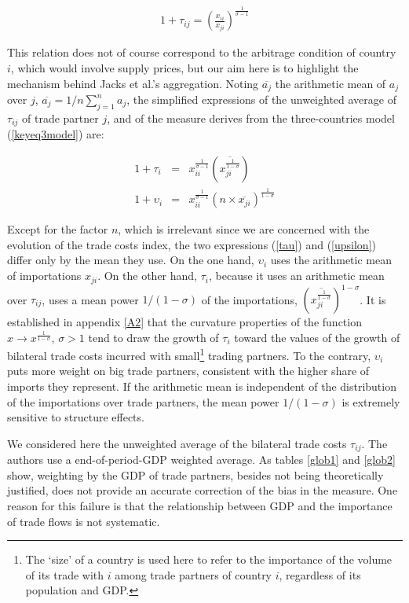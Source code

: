 \documentclass{article}
\begin{document}
\begin{eqnarray}
1+\tau_{ij}= \left(\frac{x_{ii}}{x_{ji}}\right)^{\frac{1}{\sigma-1}}\label{tausimplified}
\end{eqnarray}

This relation does not of course correspond to the arbitrage
condition of country $i$, which would involve supply prices,
but our aim here is to highlight the mechanism behind Jacks et
al.'s aggregation. Noting $\overline{a_j}$ the arithmetic mean
of $a_j$ over $j$, $\overline{a_j}=1/n \sum_{j=1}^{n}a_j$, the
simplified expressions of the unweighted average of $\tau_{ij}$
of trade partner $j$, and of the measure derives from the
three-countries model (\ref{keyeq3model}) are:

\begin{eqnarray}
1+\tau_i&=& x_{ii}^{\frac{1}{\sigma-1}} \left(\overline{{x_{ji}^{\frac{1}{1-\sigma}}}}\right) \label{tau}\\
1+\upsilon_i&=&x_{ii}^{\frac{1}{\sigma-1}} (n \times \overline{x_{ji}})^{\frac{1}{1-\sigma}}\label{upsilon}
\end{eqnarray}

Except for the factor $n$, which is irrelevant since we are
concerned with the evolution of the trade costs index, the two
expressions (\ref{tau}) and (\ref{upsilon}) differ only by the
mean they use. On the one hand, $\upsilon_i$ uses the
arithmetic mean of importations $x_{ji}$. On the other hand,
$\tau_i$, because it uses an arithmetic mean over $\tau_{ij}$,
uses a mean power $1/(1-\sigma)$ of the importations,
$\left(\overline{x_{ji}^{\frac{1}{1-\sigma}}}\right)^{1-\sigma}$.
It is established in appendix \ref{A2} that the curvature
properties of the function $x \rightarrow
x^{\frac{1}{1-\sigma}}$, $\sigma>1$ tend to draw the growth of
$\tau_i$ toward the values of the growth of bilateral trade
costs incurred with small\footnote{The `size' of a country is
used here to refer to the importance of the volume of its trade
with $i$ among trade partners of country $i$, regardless of its
population and GDP.} trading partners. To the contrary,
$\upsilon_i$ puts more weight on big trade partners, consistent
with the higher share of imports they represent. If the
arithmetic mean is independent of the distribution of the
importations over trade partners, the mean power $1/(1-\sigma)$
is extremely sensitive to structure effects.

We considered here the unweighted average of the bilateral
trade costs $\tau_{ij}$. The authors use a end-of-period-GDP
weighted average. As tables \ref{glob1} and \ref{glob2} show,
weighting by the GDP of trade partners, besides not being
theoretically justified, does not provide an accurate
correction of the bias in the measure. One reason for this
failure is that the relationship between GDP and the importance
of trade flows is not systematic.
\end{document}
